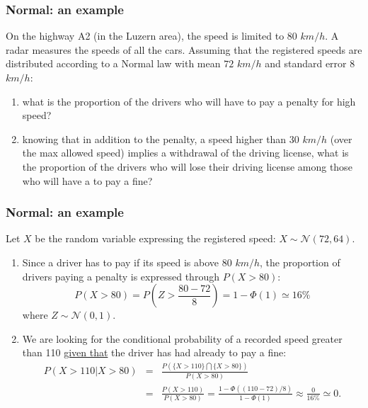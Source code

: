 \documentclass[notes=show,smaller,handout]{beamer}
\begin{document}
\begin{frame}%

\frametitle{Normal: an example}

\begin{example}

On the highway A2 (in the Luzern area), the speed is limited to $80$ $km/h$. A radar measures the speeds of all the cars. 
Assuming that the registered speeds are distributed according to a Normal law with mean $72$ $km/h$ and standard error $8$ $km/h$: \vspace{0.2cm}
\begin{enumerate}
  \item what is the proportion of the drivers who will have to pay a penalty for high speed? \vspace{0.2cm}
  \item knowing that in addition to the penalty, a speed higher than $30$ $km/h$ (over the max allowed speed) implies a withdrawal of the driving license, what is the proportion of the drivers who  will lose their driving license among those who will have a to pay a fine?
\end{enumerate}
  
\end{example}
\end{frame}



\begin{frame}%

\frametitle{Normal: an example}

\begin{example}[cont'd]
Let $X$ be the random variable expressing the registered speed: $X \sim \mathcal{N}(72,64)$.
\begin{enumerate}
  \item Since a driver has to pay if its speed is above  $80$ $km/h$, the proportion of drivers paying a penalty is expressed  through $P(X>80)$:
\begin{equation*}
P(X>80)= P\left(Z>\frac{80-72}{8} \right)=1-\Phi(1) \simeq 16 \%
\end{equation*}
where $Z \sim \mathcal{N}(0,1)$.
  \item We are looking for the conditional probability of a recorded speed greater than 110 \underline{given that} the driver has had already to pay a fine:
  \begin{eqnarray*}
  P(X>110 \vert X>80) &=&  \frac{P(\{X>110\} \bigcap \{X>80\})}{P(X>80)} \\
   &=& \frac{P(X>110)}{P(X>80)} = \frac{1- \Phi((110-72)/8)}{1-\Phi(1)}\approx \frac{0}{16\%}\simeq 0.
  \end{eqnarray*}


\end{enumerate}



\end{example}
\end{frame}
\end{document}
